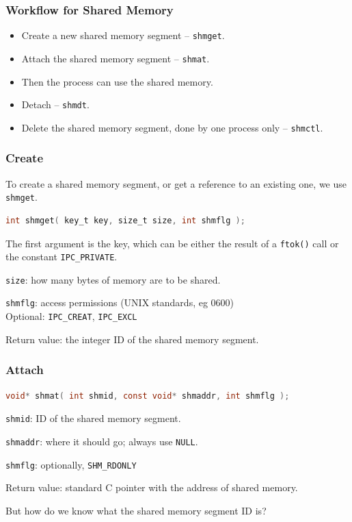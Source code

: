 \begin{frame}
	\frametitle{Workflow for Shared Memory}

	\begin{itemize}
		\item Create a new shared memory segment -- \texttt{shmget}.
		\item Attach the shared memory segment -- \texttt{shmat}.
		\item Then the process can use the shared memory.
		\item Detach -- \texttt{shmdt}.
		\item Delete the shared memory segment, done by one process only -- \texttt{shmctl}.
	\end{itemize}

\end{frame}


\begin{frame}[fragile]
	\frametitle{Create}

	To create a shared memory segment, or get a reference to an existing one, we use \texttt{shmget}.

	\begin{lstlisting}[language=C]
int shmget( key_t key, size_t size, int shmflg );
\end{lstlisting}

	The first argument is the key, which can be either the result of a \texttt{ftok()} call or the constant \texttt{IPC\_PRIVATE}.

	\texttt{size}: how many bytes of memory are to be shared.

	\texttt{shmflg}: access permissions (UNIX standards, eg 0600)\\
	\quad Optional: \texttt{IPC\_CREAT}, \texttt{IPC\_EXCL}

	Return value: the integer ID of the shared memory segment.
\end{frame}

\begin{frame}[fragile]
	\frametitle{Attach}
	\begin{lstlisting}[language=C]
void* shmat( int shmid, const void* shmaddr, int shmflg );
\end{lstlisting}

	\texttt{shmid}: ID of the shared memory segment.

	\texttt{shmaddr}: where it should go; always use \texttt{NULL}.

	\texttt{shmflg}: optionally, \texttt{SHM\_RDONLY}

	Return value: standard C pointer with the address of shared memory.

	But how do we know what the shared memory segment ID is?

\end{frame}

